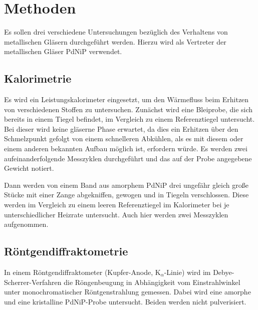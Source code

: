 \documentclass[
	a4paper,
	12pt,
	pagesize,
	ngerman
]{scrartcl}
\begin{document}

	\section{Methoden} %
	Es sollen drei verschiedene Untersuchungen bezüglich des Verhaltens von metallischen Gläsern durchgeführt werden.
	Hierzu wird als Vertreter der metallischen Gläser PdNiP verwendet.

	\subsection{Kalorimetrie}
	Es wird ein Leistungskalorimeter eingesetzt, um den Wärmefluss beim Erhitzen von verschiedenen Stoffen zu untersuchen.
	Zunächst wird eine Bleiprobe, die sich bereits in einem Tiegel befindet, im Vergleich zu einem Referenztiegel untersucht.
	Bei dieser wird keine gläserne Phase erwartet, da dies ein Erhitzen über den Schmelzpunkt gefolgt von einem schnelleren Abkühlen, als es mit diesem oder einem anderen bekannten Aufbau möglich ist, erfordern würde.
	Es werden zwei aufeinanderfolgende Messzyklen durchgeführt und das auf der Probe angegebene Gewicht notiert.

	Dann werden von einem Band aus amorphem PdNiP drei ungefähr gleich große Stücke mit einer Zange abgekniffen, gewogen und in Tiegeln verschlossen.
	Diese werden im Vergleich zu einem leeren Referenztiegel im Kalorimeter bei je unterschiedlicher Heizrate untersucht.
	Auch hier werden zwei Messzyklen aufgenommen.

	\subsection{Röntgendiffraktometrie} %
	In einem Röntgendiffraktometer (Kupfer-Anode, $\text{K}_\alpha$-Linie) wird im Debye-Scherrer-Verfahren die Röngenbeugung in Abhängigkeit vom Einstrahlwinkel unter monochromatischer Röntgenstrahlung gemessen.
	Dabei wird eine amorphe und eine kristalline PdNiP-Probe untersucht.
	Beiden werden nicht pulverisiert.	%
\end{document}
